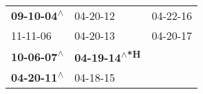 \begin{supertabular}{lll}
 \textbf{09-10-04\textsuperscript{$\wedge$}} &                     04-20-12\textsuperscript{} &  04-22-16\textsuperscript{} \\
                  11-11-06\textsuperscript{} &                     04-20-13\textsuperscript{} &  04-20-17\textsuperscript{} \\
 \textbf{10-06-07\textsuperscript{$\wedge$}} &  \textbf{04-19-14\textsuperscript{$\wedge$*H}} &                             \\
 \textbf{04-20-11\textsuperscript{$\wedge$}} &                     04-18-15\textsuperscript{} &                             \\
\end{supertabular}
